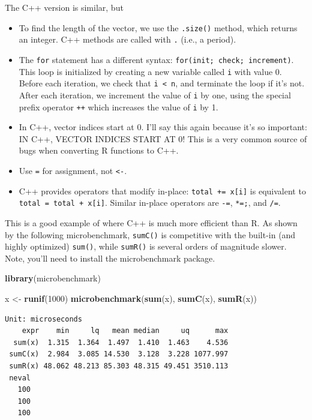 \documentclass[]{krantz}
\makeatletter
\newenvironment{Shaded}{\begin{snugshade}}{\end{snugshade}}
\newcommand{\DecValTok}[1]{\textcolor[rgb]{0.06,0.06,0.06}{#1}}
\newcommand{\KeywordTok}[1]{\textcolor[rgb]{0.27,0.27,0.27}{\textbf{#1}}}
\newcommand{\NormalTok}[1]{#1}
\newcommand{\StringTok}[1]{\textcolor[rgb]{0.5,0.5,0.5}{#1}}
\newenvironment{kframe}{%
\medskip{}
\setlength{\fboxsep}{.8em}
 \def\at@end@of@kframe{}%
 \ifinner\ifhmode%
  \def\at@end@of@kframe{\end{minipage}}%
  \begin{minipage}{\columnwidth}%
 \fi\fi%
 \def\FrameCommand##1{\hskip\@totalleftmargin \hskip-\fboxsep
 \colorbox{shadecolor}{##1}\hskip-\fboxsep
     \hskip-\linewidth \hskip-\@totalleftmargin \hskip\columnwidth}%
 \MakeFramed {\advance\hsize-\width
   \@totalleftmargin\z@ \linewidth\hsize
   \@setminipage}}%
 {\par\unskip\endMakeFramed%
 \at@end@of@kframe}
\renewenvironment{Shaded}{\begin{kframe}}{\end{kframe}}
\makeatother
\begin{document}
The C++ version is similar, but

\begin{itemize}
\item
  To find the length of the vector, we use the \texttt{.size()} method, which returns an integer. C++ methods are called with \texttt{.} (i.e., a period).
\item
  The \texttt{for} statement has a different syntax: \texttt{for(init;\ check;\ increment)}. This loop is initialized by creating a new variable called \texttt{i} with value 0. Before each iteration, we check that \texttt{i\ \textless{}\ n}, and terminate the loop if it's not. After each iteration, we increment the value of \texttt{i} by one, using the special prefix operator \texttt{++} which increases the value of \texttt{i} by 1.
\item
  In C++, vector indices start at 0. I'll say this again because it's so important: IN C++, VECTOR INDICES START AT 0! This is a very common source of bugs when converting R functions to C++.
\item
  Use \texttt{=} for assignment, not \texttt{\textless{}-}.
\item
  C++ provides operators that modify in-place: \texttt{total\ +=\ x{[}i{]}} is equivalent to \texttt{total\ =\ total\ +\ x{[}i{]}}. Similar in-place operators are \texttt{-=}, \texttt{*=;}, and \texttt{/=}.
\end{itemize}

This is a good example of where C++ is much more efficient than R. As shown by the following microbenchmark, \texttt{sumC()} is competitive with the built-in (and highly optimized) \texttt{sum()}, while \texttt{sumR()} is several orders of magnitude slower. Note, you'll need to install the microbenchmark package.

\begin{Shaded}
\begin{Highlighting}[]
\KeywordTok{library}\NormalTok{(microbenchmark)}

\NormalTok{x <-}\StringTok{ }\KeywordTok{runif}\NormalTok{(}\DecValTok{1000}\NormalTok{)}
\KeywordTok{microbenchmark}\NormalTok{(}\KeywordTok{sum}\NormalTok{(x), }\KeywordTok{sumC}\NormalTok{(x), }\KeywordTok{sumR}\NormalTok{(x))}
\end{Highlighting}
\end{Shaded}

\begin{verbatim}
Unit: microseconds
    expr    min     lq   mean median     uq      max
  sum(x)  1.315  1.364  1.497  1.410  1.463    4.536
 sumC(x)  2.984  3.085 14.530  3.128  3.228 1077.997
 sumR(x) 48.062 48.213 85.303 48.315 49.451 3510.113
 neval
   100
   100
   100
\end{verbatim}
\end{document}
